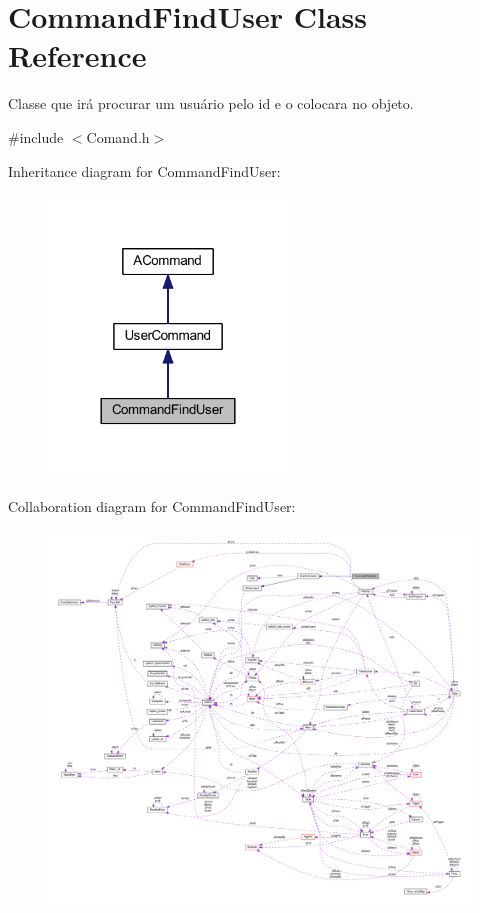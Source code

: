 \hypertarget{class_command_find_user}{\section{Command\-Find\-User Class Reference}
\label{class_command_find_user}
}


Classe que irá procurar um usuário pelo id e o colocara no objeto.  




{\ttfamily \#include $<$Comand.\-h$>$}



Inheritance diagram for Command\-Find\-User\-:\nopagebreak
\begin{figure}[H]
\begin{center}
\leavevmode
\includegraphics[width=180pt]{class_command_find_user__inherit__graph}
\end{center}
\end{figure}


Collaboration diagram for Command\-Find\-User\-:\nopagebreak
\begin{figure}[H]
\begin{center}
\leavevmode
\includegraphics[width=350pt]{class_command_find_user__coll__graph}
\end{center}
\end{figure}
